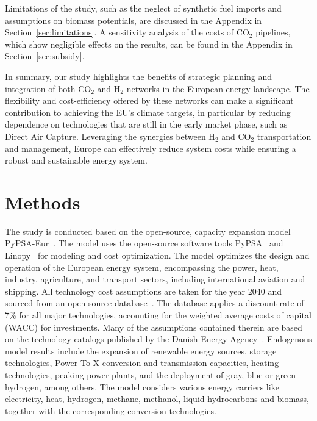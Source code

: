 \documentclass[twocolumn]{article}
\newcommand{\carbon}{CO$_2$}
\newcommand{\hydrogen}{H$_2$}
\begin{document}
Limitations of the study, such as the neglect of synthetic fuel imports and assumptions on biomass potentials, are discussed in the Appendix in Section~\ref{sec:limitations}. A sensitivity analysis of the costs of \carbon{} pipelines, which show negligible effects on the results, can be found in the Appendix in Section~\ref{sec:subsidy}.

In summary, our study highlights the benefits of strategic planning and integration of both \carbon{} and \hydrogen{} networks in the European energy landscape. The flexibility and cost-efficiency offered by these networks can make a significant contribution to achieving the EU's climate targets, in particular by reducing dependence on technologies that are still in the early market phase, such as Direct Air Capture. Leveraging the synergies between \hydrogen{} and \carbon{} transportation and management, Europe can effectively reduce system costs while ensuring a robust and sustainable energy system.


\section*{Methods}
\label{sec:methodology}

The study is conducted based on the open-source, capacity expansion model PyPSA-Eur~\cite{horschPyPSAEurOpenOptimisation2018,brownSynergiesSectorCoupling2018,PyPSAEurSecSectorCoupledOpen2023}.
The model uses the open-source software tools PyPSA~\cite{brownPyPSAPythonPower2018} and Linopy~\cite{hofmannLinopyLinearOptimization2023}
for modeling and cost optimization.
The model optimizes the design and operation of the European energy system, encompassing the power, heat, industry, agriculture, and transport sectors, including international aviation and shipping.
All technology cost assumptions are taken for the year 2040 and sourced from an open-source database~\cite{lisazeyenPyPSATechnologydataTechnology2023}. The database applies a discount rate of 7\% for all major technologies, accounting for the weighted average costs of capital (WACC) for investments.
Many of the assumptions contained therein are based on the technology catalogs published by the Danish Energy Agency~\cite{danishenergyagencyTechnologyDataGeneration2019,thedanishenergyagencyTechnologyDataCarbon2023}.
Endogenous model results include the expansion of renewable energy sources, storage technologies, Power-To-X conversion and transmission capacities, heating technologies, peaking power plants, and the deployment of gray, blue or green hydrogen, among others.
The model considers various energy carriers like electricity, heat, hydrogen, methane, methanol, liquid hydrocarbons and biomass, together with the corresponding conversion technologies.
\end{document}
